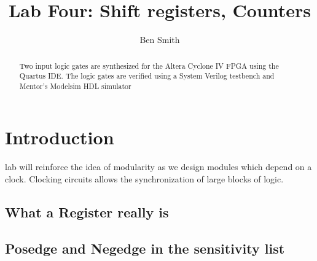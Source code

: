 
\newcommand{\TITLE}{Lab Four: Shift registers, Counters}
\newcommand{\KEYWORDS}{Logic Gates, Verilog, FPGA, Signaltap, Synthesis}
\newcommand{\ABSTRACT}{Two input logic gates are synthesized for the Altera Cyclone IV FPGA using the Quartus IDE. The logic gates are verified using a System Verilog testbench and Mentor's Modelsim HDL simulator}

\title{Lab Four: Shift registers, Counters}
\author{Ben Smith}




  \maketitle
    \begin{abstract}
      Two input logic gates are synthesized for the Altera Cyclone IV FPGA using the Quartus IDE. The logic gates are verified using a System Verilog testbench and Mentor's Modelsim HDL simulator
    \end{abstract}
\section{\bfseries Introduction}
   lab will reinforce the idea of modularity as we design modules which depend on a clock. Clocking circuits allows the synchronization of large blocks of logic. 

  \subsection{What a Register really is}

  \subsection{Posedge and Negedge in the sensitivity list}

